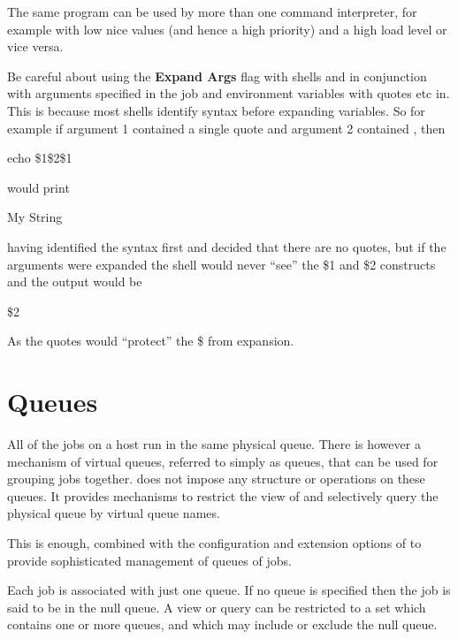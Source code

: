 The same program can be used by more than one command interpreter, for example with low nice values (and hence a high priority) and a high
load level or vice versa.

Be careful about using the \textbf{Expand Args} flag with shells and in conjunction with arguments specified in the job and environment
variables with quotes etc in. This is because most shells identify syntax before expanding variables. So for example if argument 1
contained a single quote and argument 2 contained , then

\begin{expara}

echo \$1\$2\$1

\end{expara}

would print

\begin{expara}

{\textquotesingle}My String{\textquotesingle}

\end{expara}

having identified the syntax first and decided that there are no quotes, but if the arguments were expanded the shell would never
``see'' the \$1 and \$2 constructs and the output would be

\begin{expara}

\$2

\end{expara}

As the quotes would ``protect'' the \$ from expansion.

\section{Queues}
All of the jobs on a \ProductName{} host run in the same physical queue. There is however a mechanism of virtual queues, referred to simply as queues,
that can be used for grouping jobs together. \ProductName{} does not impose any structure or operations on these queues. It provides mechanisms to
restrict the view of and selectively query the physical queue by virtual queue names.

This is enough, combined with the configuration and extension options of \ProductName{} to provide sophisticated management of queues of
jobs.

Each job is associated with just one queue. If no queue is specified then the job is said to be in the null queue. A view or query can be
restricted to a set which contains one or more queues, and which may include or exclude the null queue.

